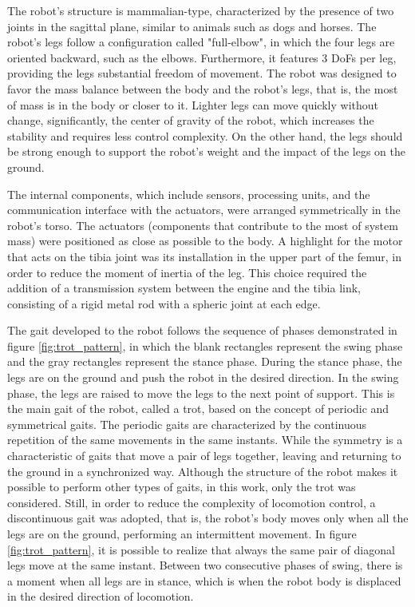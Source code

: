 \documentclass[conference]{IEEEtran}
\begin{document}
The robot's structure is mammalian-type, characterized by the presence of two joints in the sagittal plane, similar to animals such as dogs and horses.  The robot’s legs follow a configuration called "full-elbow", in which the four legs are oriented backward, such as the elbows. Furthermore, it features 3 DoFs per leg, providing the legs substantial freedom of movement. The robot was designed to favor the mass balance between the body and the robot's legs, that is, the most of mass is in the body or closer to it. Lighter legs can move quickly without change, significantly, the center of gravity of the robot, which increases the stability and requires less control complexity.  On the other hand, the legs should be strong enough to support the robot's weight and the impact of the legs on the ground. 

The internal components, which include sensors, processing units, and the communication interface with the actuators, were arranged symmetrically in the robot's torso. The actuators (components that contribute to the most of system mass) were positioned as close as possible to the body. A highlight for the motor that acts on the tibia joint was its installation in the upper part of the femur, in order to reduce the moment of inertia of the leg. This choice required the addition of a transmission system between the engine and the tibia link, consisting of a rigid metal rod with a spheric joint at each edge.

The gait developed to the robot follows the sequence of phases demonstrated in figure \ref{fig:trot_pattern}, in which the blank rectangles represent the  swing phase and the gray rectangles represent the stance phase. During the stance phase, the legs are on the ground and push the robot in the desired direction.  In the swing phase, the legs are raised to move the legs to the next point of support. This is the main gait of the robot, called a trot, based on the concept of periodic and symmetrical gaits. The periodic gaits are characterized by the continuous repetition of the same movements in the same instants. While the symmetry is a characteristic of gaits that move a pair of legs together, leaving and returning to the ground in a synchronized way. Although the structure of the robot makes it possible to perform other types of gaits, in this work, only the trot was considered. Still,  in order to reduce the complexity of locomotion control, a discontinuous gait was adopted, that is, the robot's body moves only when all the legs are on the ground, performing an intermittent movement. In figure \ref{fig:trot_pattern}, it is possible to realize that always the same pair of diagonal legs move at the same instant. Between two consecutive phases of swing, there is a moment when all legs are in stance, which is when the robot body is displaced in the desired direction of locomotion.
\end{document}
